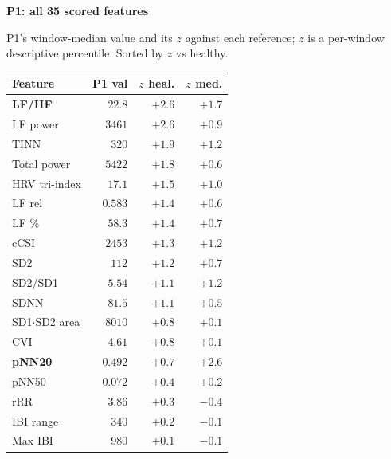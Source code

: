 \documentclass[fontsize=9pt]{scrartcl}
\renewcommand{\arraystretch}{1.35}
\newlength{\panelB}\setlength{\panelB}{100mm}
\newcommand{\ctitle}[2][jcgreen]{{\color{#1}\bfseries\large #2}\par\vspace{1.6mm}}
\begin{document}
\begin{minipage}[t][210mm][t]{\panelB}%
\begin{tcolorbox}[panel,colback=jcindigo,width=\panelB,height=210mm,fontupper=\color{white}]
  \vspace{3mm}

  \begin{tcolorbox}[card, borderline west={2.2mm}{0mm}{jupurple}]
    \ctitle[jupurple]{P1: all 35 scored features}
    {\color{inkdark}\footnotesize
     P1's window-median value and its $z$ against each reference; $z$ is a
     per-window descriptive percentile. Sorted by $z$ vs healthy.\par}
    \vspace{1.6mm}
    {\color{inkdark}\scriptsize
    \renewcommand{\arraystretch}{1.0}%
    \setlength{\tabcolsep}{2.6pt}%
    \begin{tabular}{@{}l r r r@{}}
      \textbf{Feature} & \textbf{P1 val} & \textbf{$z$ heal.} & \textbf{$z$ med.}\\
      \hline
      \textbf{LF/HF} & $\mathbf{22.8}$ & $\mathbf{+2.6}$ & $\mathbf{+1.7}$\\
      LF power & $3461$ & $+2.6$ & $+0.9$\\
      TINN & $320$ & $+1.9$ & $+1.2$\\
      Total power & $5422$ & $+1.8$ & $+0.6$\\
      HRV tri-index & $17.1$ & $+1.5$ & $+1.0$\\
      LF rel & $0.583$ & $+1.4$ & $+0.6$\\
      LF \% & $58.3$ & $+1.4$ & $+0.7$\\
      cCSI & $2453$ & $+1.3$ & $+1.2$\\
      SD2 & $112$ & $+1.2$ & $+0.7$\\
      SD2/SD1 & $5.54$ & $+1.1$ & $+1.2$\\
      SDNN & $81.5$ & $+1.1$ & $+0.5$\\
      SD1$\cdot$SD2 area & $8010$ & $+0.8$ & $+0.1$\\
      CVI & $4.61$ & $+0.8$ & $+0.1$\\
      \textbf{pNN20} & $\mathbf{0.492}$ & $\mathbf{+0.7}$ & $\mathbf{+2.6}$\\
      pNN50 & $0.072$ & $+0.4$ & $+0.2$\\
      rRR & $3.86$ & $+0.3$ & $-0.4$\\
      IBI range & $340$ & $+0.2$ & $-0.1$\\
      Max IBI & $980$ & $+0.1$ & $-0.1$\\

\end{tabular}}
\end{tcolorbox}
\end{tcolorbox}
\end{minipage}
\end{document}
